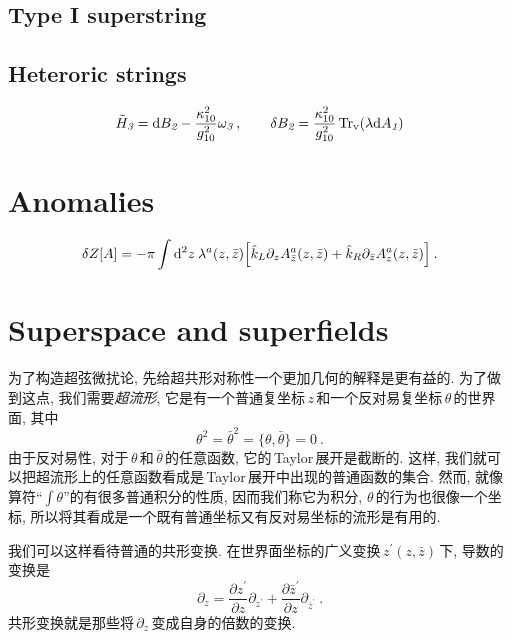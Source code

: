 \subsection*{Type I superstring}

\subsection*{Heteroric strings}

\begin{equation}
    \tilde{H}_{\textit{3}}=\mathrm{d} B_{\textit{2}} - \frac{\kappa_{10}^{2}}{g_{10}^{2}}\omega_{\textit{3}}  \:, \qquad
        \delta B_{\textit{2}} = \frac{\kappa_{10}^{2}}{g_{10}^{2}}\operatorname{Tr}_{\mathrm{v}}(\lambda\mathrm{d} A_{\textit{1}})\label{12.1.40}
\end{equation}


\section{Anomalies}

\begin{equation}
    \delta Z[A] = -\pi \int \mathrm{d}^{2}z\:\lambda^{a}(z,\bar{z})
    \Bigl[\hat{k}_{L}\partial_{z}A_{\bar{z}}^{a}(z,\bar{z})+\hat{k}_{R}\partial_{\bar{z}}A_{z}^{a}(z,\bar{z})\Bigr]\:.
    \label{12.2.3}
\end{equation}

\section{Superspace and superfields}

为了构造超弦微扰论, 先给超共形对称性一个更加几何的解释是更有益的. 为了做到这点, 我们需要{\emph{超流形}}, 它是有一个普通复坐标$\,z\,$和一个反对易复坐标$\,\theta\,$的世界面, 其中
\begin{equation}
    \theta^{2}=\bar{\theta}^{2} = \{\theta,\bar{\theta}\} = 0 \:. \label{12.3.1}
\end{equation}
由于反对易性, 对于$\,\theta\,$和$\,\bar{\theta}\,$的任意函数, 它的\,Taylor\,展开是截断的. 这样, 我们就可以把超流形上的任意函数看成是\,Taylor\,展开中出现的普通函数的集合. 然而, 就像算符``$\int\theta$''的有很多普通积分的性质, 因而我们称它为积分, $\theta\,$的行为也很像一个坐标, 所以将其看成是一个既有普通坐标又有反对易坐标的流形是有用的.

我们可以这样看待普通的共形变换. 在世界面坐标的广义变换$\,z^{\prime}(z,\bar{z})\,$下, 导数的变换是
\begin{equation}
    \partial_{z} = \frac{\partial z^{\prime}}{\partial z} \partial_{z^{\prime}}
    +\frac{\partial \bar{z}^{\prime}}{\partial z} \partial_{\bar{z}^{\prime}} \:.\label{12.3.2}
\end{equation}
共形变换就是那些将$\,\partial_{z}\,$变成自身的倍数的变换.


